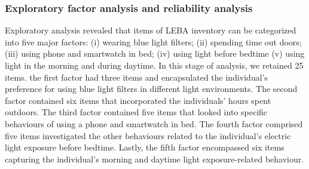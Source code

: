 \documentclass[
  man]{apa6}
\begin{document}
\hypertarget{exploratory-factor-analysis-and-reliability-analysis}{%
\subsubsection{Exploratory factor analysis and reliability analysis}\label{exploratory-factor-analysis-and-reliability-analysis}}

Exploratory analysis revealed that items of LEBA inventory can be categorized into five major factors: (i) wearing blue light filters; (ii) spending time out doors; (iii) using phone and smartwatch in bed; (iv) using light before bedtime (v) using light in the morning and during daytime. In this stage of analysis, we retained 25 items. the first factor had three items and encapsulated the individual's preference for using blue light filters in different light environments. The second factor contained six items that incorporated the individuals' hours spent outdoors. The third factor contained five items that looked into specific behaviours of using a phone and smartwatch in bed. The fourth factor comprised five items investigated the other behaviours related to the individual's electric light exposure before bedtime. Lastly, the fifth factor encompassed six items capturing the individual's morning and daytime light exposure-related behaviour.
\end{document}
